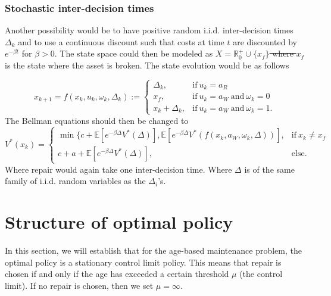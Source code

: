 \documentclass[a4paper]{thesis}
\theoremstyle{definition}
\providecommand{\DIFaddtex}[1]{{\protect\color{blue}\uwave{#1}}} %
\providecommand{\DIFdeltex}[1]{{\protect\color{red}\sout{#1}}}                      %
\providecommand{\DIFaddbegin}{} %
\providecommand{\DIFaddend}{} %
\providecommand{\DIFdelbegin}{} %
\providecommand{\DIFdelend}{} %
\providecommand{\DIFadd}[1]{\texorpdfstring{\DIFaddtex{#1}}{#1}} %
\providecommand{\DIFdel}[1]{\texorpdfstring{\DIFdeltex{#1}}{}} %
\newcommand{\DIFscaledelfig}{0.5}
\newlength{\DIFdelgraphicswidth} %
\newlength{\DIFdelgraphicsheight} %
\newcommand{\DIFaddincludegraphics}[2][]{{\color{blue}\fbox{\DIFOincludegraphics[#1]{#2}}}} %
\newcommand{\DIFdelincludegraphics}[2][]{%
	\sbox{\DIFdelgraphicsbox}{\DIFOincludegraphics[#1]{#2}}%
	\settoboxwidth{\DIFdelgraphicswidth}{\DIFdelgraphicsbox} %
	\settoboxtotalheight{\DIFdelgraphicsheight}{\DIFdelgraphicsbox} %
	\scalebox{\DIFscaledelfig}{%
		\parbox[b]{\DIFdelgraphicswidth}{\usebox{\DIFdelgraphicsbox}\\[-\baselineskip] \rule{\DIFdelgraphicswidth}{0em}}\llap{\resizebox{\DIFdelgraphicswidth}{\DIFdelgraphicsheight}{%
				\setlength{\unitlength}{\DIFdelgraphicswidth}%
				\begin{picture}(1,1)%
				\thicklines\linethickness{2pt} %
				{\color[rgb]{1,0,0}\put(0,0){\framebox(1,1){}}}%
				{\color[rgb]{1,0,0}\put(0,0){\line( 1,1){1}}}%
				{\color[rgb]{1,0,0}\put(0,1){\line(1,-1){1}}}%
				\end{picture}%
			}\hspace*{3pt}}} %
} %
\DeclareRobustCommand{\DIFaddbegin}{\DIFOaddbegin \let\includegraphics\DIFaddincludegraphics} %
\DeclareRobustCommand{\DIFaddend}{\DIFOaddend \let\includegraphics\DIFOincludegraphics} %
\DeclareRobustCommand{\DIFdelbegin}{\DIFOdelbegin \let\includegraphics\DIFdelincludegraphics} %
\DeclareRobustCommand{\DIFdelend}{\DIFOaddend \let\includegraphics\DIFOincludegraphics} %
\begin{document}
	\subsubsection{Stochastic inter-decision times}
	Another possibility would be to have positive random i.i.d. inter-decision times $\Delta_k$ and to use a continuous discount such that costs at time $t$ are discounted by $e^{-\beta t}$ for $\beta>0$.
	The state space could then be modeled as \DIFdelbegin \DIFdel{$X=\mathbb{R}_0^+\cup\{x_f\}$ where $x_f$ }\DIFdelend \DIFaddbegin \DIFadd{$X=\mathbb{R}_0^+\cup\{x_{BREAK}\}$ where $x_{BREAK}$ }\DIFaddend is the state where the asset is broken.
	The state evolution would be as follows\DIFaddbegin \DIFadd{:
	}\DIFaddend 
	
	$$
	x_{k+1}=f(x_k,u_k,\omega_k,\Delta_k):=\begin{cases}
	\Delta_k,&\text{if}\ u_k=a_R \\
	x_f,&\text{if}\ u_k=a_W\ \text{and}\ \omega_k=0 \\
	x_k+\Delta_k,&\text{if}\ u_k=a_W\ \text{and}\ \omega_k=1.
	\end{cases}
	$$
	The Bellman equations should then be changed to
	$$
	V^*(x_k)=\begin{cases}
	\min\{c+\mathbb{E}[e^{-\beta \Delta} V^*(\Delta)],\mathbb{E}[e^{-\beta \Delta} V^*(f(x_k,a_W,\omega_k,\Delta))],&\text{if}\ x_k\neq x_f \\
	c+a+\mathbb{E}[e^{-\beta \Delta} V^*(\Delta)],&\text{else.}
	\end{cases}
	$$
	Where repair would again take one inter-decision time. Where $\Delta$ is of the same family of i.i.d. random variables as the $\Delta_i$'s.
	
	\section{Structure of optimal policy}
	In this section, we will establish that for the age-based maintenance problem, the optimal policy is a stationary control limit policy.
	This means that repair is chosen if and only if the age has exceeded a certain threshold \DIFdelbegin \DIFdel{$\mu$ }\DIFdelend \DIFaddbegin \DIFadd{$\mu^*$ }\DIFaddend (the control limit).
	If no repair is chosen, then we set \DIFdelbegin \DIFdel{$\mu=\infty$}\DIFdelend \DIFaddbegin \DIFadd{$\mu^*=\infty$}\DIFaddend .
	
\end{document}
